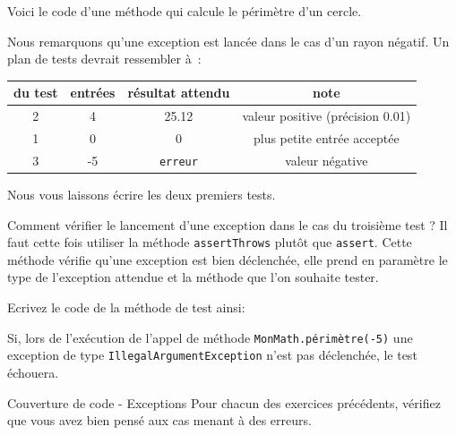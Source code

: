 \documentclass[a4paper,11pt]{style-esi/td}
\begin{document}
Voici le code d'une méthode qui calcule le périmètre d'un cercle.

Nous remarquons qu'une exception est lancée dans le cas d'un rayon négatif.
Un plan de tests devrait ressembler à~:

\begin{center}
	\begin{tabular}{|c|c|c|c|}
		\hline
		\no du test & entrées & résultat attendu & note                             \\
		\hline
		2           & 4       & 25.12            & valeur positive (précision 0.01) \\
		\hline
		1           & 0       & 0                & plus petite entrée acceptée      \\
		\hline
		3           & -5      & \texttt{erreur}  & valeur négative                  \\
		\hline
	\end{tabular}
\end{center}

Nous vous laissons écrire les deux premiers tests.

Comment vérifier le lancement d'une exception dans le cas du troisième test ? Il faut cette fois utiliser la méthode \texttt{assertThrows} plutôt que \texttt{assert}. Cette méthode vérifie qu'une exception est bien déclenchée, elle prend en paramètre le type de l'exception attendue et la méthode que l'on souhaite tester.

Ecrivez le code de la méthode de test ainsi:


Si, lors de l'exécution de l'appel de méthode \texttt{MonMath.périmètre(-5)} une exception de type \texttt{IllegalArgumentException} n'est pas déclenchée, le test échouera.


\begin{Exercice}{Couverture de code - Exceptions}
	Pour chacun des exercices précédents, 
	vérifiez que vous avez bien pensé aux cas menant à des erreurs.
\end{Exercice}
\end{document}
